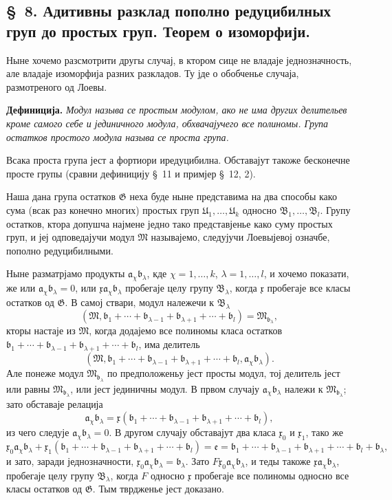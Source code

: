 ﻿\documentclass[11pt]{article}
\providecommand{\mM}{\mathfrak M}
\providecommand{\mG}{\mathfrak G}
\providecommand{\mU}{\mathfrak U}
\providecommand{\mB}{\mathfrak B}
\providecommand{\ma}{\mathfrak a}
\providecommand{\mb}{\mathfrak b}
\providecommand{\me}{\mathfrak e}
\providecommand{\mx}{\mathfrak x}
\begin{document}

\setcounter{footnote}{16}
\subsection*{\S~8. Адитивны разклад пополно редуцибилных груп до простых груп. Теорем о изоморфији.}

Ныне хочемо разсмотрити другы случај, в ктором сице не владаје једнозначность, але владаје изоморфија разних разкладов. Ту јде о обобченье случаја, размотреного од Лоевы.

\textbf{Дефиниција.} \textit{Модул называ се простым модулом, ако не има других делительев кроме самого себе и јединичного модула, обхвачајучего все полиномы. Група остатков простого модула называ се проста група.}

Всака проста група јест а фортиори иредуцибилна. Обставајут такоже бесконечне просте групы (сравни дефиницију \S~11 и примјер \S~12, 2).

Наша дана група остатков \(\mG\) неха буде ныне представима на два способы како сума (всак раз конечно многих) простых груп \(\mU_1,\ldots,\mU_k\) односно \(\mB_1,\ldots,\mB_l\). Групу остатков, ктора допушча најмене једно тако представјенье како суму простых груп, и јеј одповедајучи модул \(\mM\) называјемо, следујучи Лоевыјевој означбе, пополно редуцибилными.

Ныне разматрјамо продукты \(\ma_\chi\mb_\lambda\), кде \(\chi=1,\ldots,k\), \(\lambda=1,\ldots,l\), и хочемо показати, же или \(\ma_\chi\mb_\lambda=0\), или \(\mx\ma_\chi\mb_\lambda\) пробегаје целу групу \(\mB_\lambda\), когда \(\mx\) пробегаје все класы остатков од \(\mG\). В самој ствари, модул належечи к \(\mB_\lambda\)
\[
 (\mM,\mb_1+\cdots+\mb_{\lambda-1}+\mb_{\lambda+1}+\cdots+\mb_l)=\mM_{\mb_\lambda},
\]
кторы настаје из \(\mM\), когда додајемо все полиномы класа остатков \(\mb_1+
\cdots+\mb_{\lambda-1}+\mb_{\lambda+1}+\cdots+\mb_l\), има делитель
\[
 (\mM,\mb_1+\cdots+\mb_{\lambda-1}+\mb_{\lambda+1}+\cdots+\mb_l,
 \ma_\chi\mb_\lambda).
\]
Але понеже модул \(\mM_{\mb_\lambda}\) по предположеньу јест просты модул, тој делитель јест или равны \(\mM_{\mb_\lambda}\), или јест јединичны модул. В првом случају \(\ma_\chi\mb_\lambda\) належи к \(\mM_{\mb_\lambda}\); зато обставаје релација
\[
 \ma_\chi\mb_\lambda=\mx(\mb_1+
\cdots+\mb_{\lambda-1}+\mb_{\lambda+1}+\cdots+\mb_l),
\]
из чего следује \(\ma_\chi\mb_\lambda=0\). В другом случају обставајут два класа \(\mx_0\) и \(\mx_1\), тако же
\[
 \mx_0\ma_\chi\mb_\lambda
 +\mx_1(\mb_1+\cdots+\mb_{\lambda-1}+\mb_{\lambda+1}+\cdots+\mb_l)
 =\me=\mb_1+\cdots+\mb_{\lambda-1}+\mb_{\lambda+1}+\cdots+\mb_l+\mb_\lambda,
\]
и зато, заради једнозначности, \(\mx_0\ma_\chi\mb_\lambda=\mb_\lambda\). Зато \(F\mx_0\ma_\chi\mb_\lambda\), и теды такоже \(\mx\ma_\chi\mb_\lambda\), пробегаје целу групу \(\mB_\lambda\), когда \(F\) односно \(\mx\) пробегаје все полиномы односно все класы остатков од \(\mG\). Тым тврдженье јест доказано.
\end{document}
